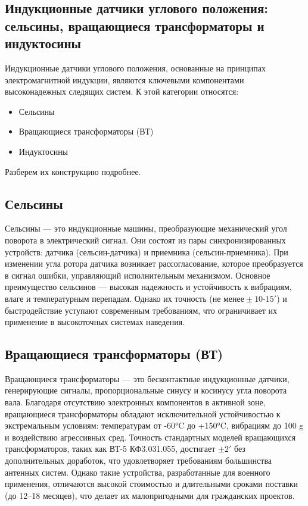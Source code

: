 \FloatBarrier
\subsection{Индукционные датчики углового положения: сельсины, вращающиеся трансформаторы и индуктосины}

Индукционные датчики углового положения, основанные на принципах электромагнитной индукции, являются ключевыми компонентами высоконадежных следящих систем. 
К этой категории относятся: 
\begin{itemize} 
  \item Сельсины 
  \item Вращающиеся трансформаторы (ВТ) 
  \item Индуктосины 
\end{itemize}

Разберем их конструкцию подробнее.

\subsection{Сельсины}

Сельсины — это индукционные машины, преобразующие механический угол поворота в электрический сигнал. Они состоят из пары синхронизированных устройств: датчика (сельсин-датчика) 
и приемника (сельсин-приемника). При изменении угла ротора датчика возникает рассогласование, которое преобразуется в сигнал ошибки, управляющий исполнительным механизмом.
Основное преимущество сельсинов — высокая надежность и устойчивость к вибрациям, влаге и температурным перепадам. Однако их точность ($ \text{не менее}\pm 10 \text{-} 15'$) 
и быстродействие уступают современным требованиям, что ограничивает их применение в высокоточных системах наведения.

\subsection{Вращающиеся трансформаторы (ВТ)}

Вращающиеся трансформаторы — это бесконтактные индукционные датчики, генерирующие сигналы, пропорциональные синусу и косинусу угла поворота вала. 
Благодаря отсутствию электронных компонентов в активной зоне, вращающиеся трансформаторы обладают исключительной устойчивостью к экстремальным условиям: температурам от -60°C до +150°C, 
вибрациям до 100 g и воздействию агрессивных сред.
Точность стандартных моделей вращающихся трансформаторов, таких как ВТ-5 КФ3.031.055, достигает $ \pm 2'$ без дополнительных доработок, 
что удовлетворяет требованиям большинства антенных систем. 
Однако такие устройства, разработанные для военного применения, отличаются высокой стоимостью и длительными сроками поставки (до 12–18 месяцев), 
что делает их малопригодными для гражданских проектов.

